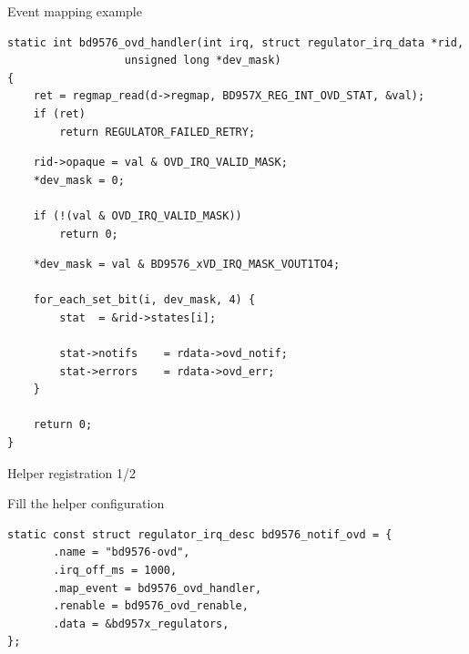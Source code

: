 \documentclass[10pt]{beamer}
\begin{document}

\begin{frame}[fragile]{Event mapping example}
\lstset{language=C}
\scriptsize

\begin{lstlisting}
static int bd9576_ovd_handler(int irq, struct regulator_irq_data *rid,
			      unsigned long *dev_mask)
{
	ret = regmap_read(d->regmap, BD957X_REG_INT_OVD_STAT, &val);
	if (ret)
		return REGULATOR_FAILED_RETRY;

\end{lstlisting}

\pause
\begin{lstlisting}
	rid->opaque = val & OVD_IRQ_VALID_MASK;
	*dev_mask = 0;

	if (!(val & OVD_IRQ_VALID_MASK))
		return 0;
\end{lstlisting}
\pause
\begin{lstlisting}
	*dev_mask = val & BD9576_xVD_IRQ_MASK_VOUT1TO4;

	for_each_set_bit(i, dev_mask, 4) {
		stat  = &rid->states[i];

		stat->notifs	= rdata->ovd_notif;
		stat->errors	= rdata->ovd_err;
	}

	return 0;
}

\end{lstlisting}
\end{frame}



\begin{frame}[fragile]{Helper registration 1/2}
\lstset{language=C}
\scriptsize

Fill the helper configuration
\pause
\begin{lstlisting}
static const struct regulator_irq_desc bd9576_notif_ovd = {              
       .name = "bd9576-ovd",                                            
       .irq_off_ms = 1000,                                              
       .map_event = bd9576_ovd_handler,                                 
       .renable = bd9576_ovd_renable,                                   
       .data = &bd957x_regulators,                                      
}; 
\end{lstlisting}
\end{frame}
\end{document}
